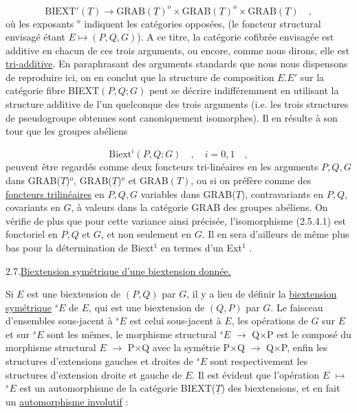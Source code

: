 \begin{equation}\tag{2.6.1}
\mathrm{BIEXT}'(\underline{T}) \longrightarrow \mathrm{GRAB}(\underline{T})^{o}\times\mathrm{GRAB}(\underline{T})^{o}\times \mathrm{GRAB}(\underline{T}) \quad ,
\end{equation}
où les exposants $^{o}$ indiquent les catégories opposées, (le foncteur structural envisagé étant $E \longmapsto (P,Q,G)$). A ce titre, la catégorie cofibrée envisagée est additive en chacun de ces trois arguments, ou encore, comme nous dirons, elle est \underline{tri-additive}. En paraphrasant des arguments standards que nous nous dispensons de reproduire ici, on en conclut que la structure de composition $E.E'$ sur la catégorie fibre BIEXT$(P,Q;G)$ peut se décrire indifféremment en utilisant la structure additive de l'un quelconque des trois arguments (i.e. les trois structures de pseudogroupe obtenues sont canoniquement isomorphes). Il en résulte à son tour que les groupes abéliens

\begin{equation}\tag{2.6.2}
\mathrm{Biext}^{i}(P,Q;G) \quad , \quad i=0,1 \quad ,
\end{equation}
peuvent être regardés comme deux foncteurs tri-linéaires en les arguments $P,Q,G$ dans GRAB($\underline{T}$)$^{o}$, GRAB($\underline{T}$)$^{o}$ et GRAB$(T)$, ou si on préfère comme des \underline{foncteurs trilinéaires} en $P,Q,G$ variables dans GRAB($\underline{T}$), contravariants en $P,Q$, covariants en $G$, à valeurs dans la catégorie GRAB des groupes abéliens. On vérifie de plus que pour cette variance ainsi précisée, l'isomorphisme (2.5.4.1) est fonctoriel en $P,Q$ et $G$, et non seulement en $G$. Il en sera d'ailleurs de même plus bas pour la détermination de Biext$^{1}$ en termes d'un Ext$^{1}$ .


2.7.\underline{Biextension symétrique d'une biextension donnée.}

Si $E$ est une biextension de $(P,Q)$ par $G$, il y a lieu de définir la \underline{biextension symétrique} $^{s}E$ de $E$, qui est une biextension de $(Q,P)$ par $G$. Le faisceau d'ensembles sous-jacent à $^{s}E$ est celui sous-jacent à $E$, les opérations de $G$ sur $E$ et sur $^{s}E$ sont les mêmes, le morphisme structural $^{s}E$ $\longrightarrow$ Q$\times$P est le composé du morphisme structural $E$ $\longrightarrow$ P$\times$Q avec la symétrie P$\times$Q $\longrightarrow$ Q$\times$P, enfin les structures
d'extensions gauches et droites de $^{s}E$ sont respectivement les structures d'extension droite et gauche de $E$. Il est évident que l'opération $E$ $\longmapsto$ $^{s}E$ est un automorphisme de la catégorie BIEXT($\underline{T}$) des biextensions, et en fait un \underline{automorphisme involutif} :

